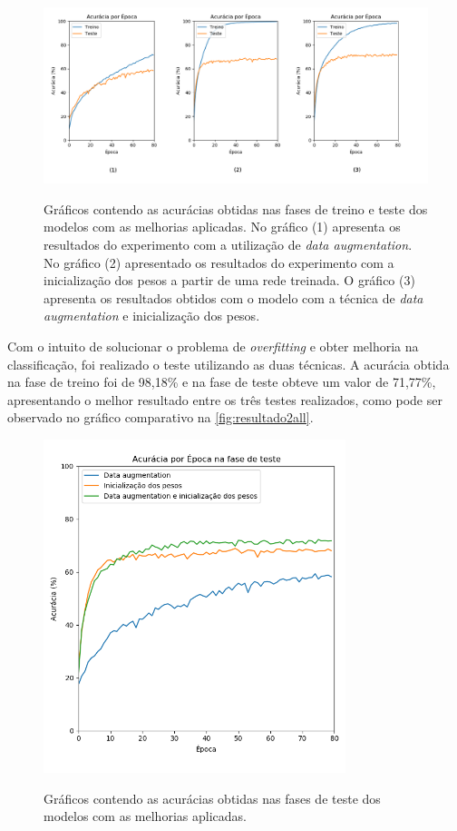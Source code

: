 \begin{figure}[H]
  \centering
  \caption{Gráficos contendo as acurácias obtidas nas fases de treino e teste dos modelos com as melhorias aplicadas. No gráfico (1) apresenta os resultados do experimento com a utilização de \textit{data augmentation}. No gráfico (2) apresentado os resultados do experimento com a inicialização dos pesos a partir de uma rede treinada. O gráfico (3) apresenta os resultados obtidos com o modelo com a técnica de \textit{data augmentation} e inicialização dos pesos.}
  \includegraphics[width=500pt]{dados/figuras/resultado2}
  \label{fig:resultado2}
\end{figure}

\par Com o intuito de solucionar o problema de \textit{overfitting} e obter melhoria na classificação, foi realizado o teste utilizando as duas técnicas. A acurácia obtida na fase de treino foi de 98,18\% e na fase de teste obteve um valor de 71,77\%, apresentando o melhor resultado entre os três testes realizados, como pode ser observado no gráfico comparativo na \autoref{fig:resultado2all}.%
\begin{figure}[H]
  \centering
  \caption{Gráficos contendo as acurácias obtidas nas fases de teste dos modelos com as melhorias aplicadas.}
  \includegraphics[width=250pt]{dados/figuras/resultado2_all}
  \label{fig:resultado2all}
\end{figure}
 
